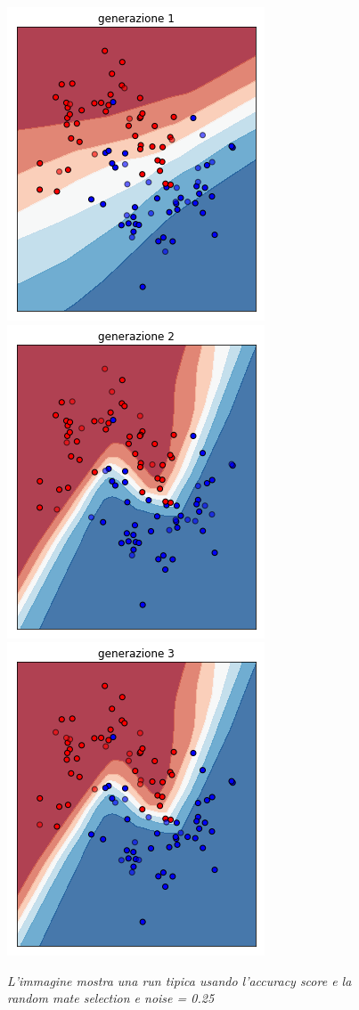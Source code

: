 \documentclass[12pt,a4paper]{report}
\begin{document}
\begin{figure}[H]
 \centering
 \includegraphics[scale = 0.4]{images/moons-rnd-acc./1}
 \includegraphics[scale = 0.4]{images/moons-rnd-acc./2}
 \includegraphics[scale = 0.4]{images/moons-rnd-acc./3}
 \caption{\textit{L'immagine mostra una run tipica usando l'accuracy score e la random mate selection e noise = 0.25}}
 \label{moons1}
\end{figure}
\end{document}
